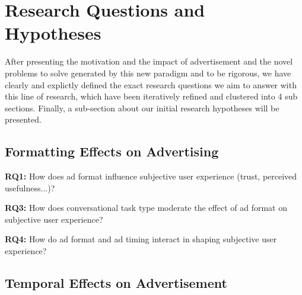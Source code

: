 \documentclass[english]{article}
\begin{document}

\color{black}

\section{Research Questions and Hypotheses}
\label{sec:intro:research-questions}

After presenting the motivation and the impact of advertisement and the novel problems to solve generated by this new paradigm and to be rigorous, we have clearly and explictly defined the exact research questions we aim to answer with this line of research, which have been iteratively refined and clustered into 4 sub sections. Finally, a sub-section about our initial research hypotheses will be presented.

\subsection{Formatting Effects on Advertising}

\textbf{RQ1:} How does ad format influence subjective user experience (trust, perceived usefulness...)?

\textbf{RQ3:} How does conversational task type moderate the effect of ad format on subjective user experience?


\textbf{RQ4:} How do ad format and ad timing interact in shaping subjective user experience?

\subsection{Temporal Effects on Advertisement}
\end{document}
